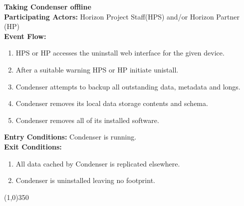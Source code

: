 	\textbf{Taking Condenser offline} \\	 
	\textbf{Participating Actors:}  Horizon Project Staff(HPS) and/or Horizon Partner (HP) \\
	\textbf{Event Flow:}
	\begin{enumerate}
\item HPS or HP accesses the uninstall web interface for the given device. 
\item After a suitable warning HPS or HP initiate unistall.
\item Condenser attempts to backup all outstanding data, metadata and longs.
\item Condenser removes its local data storage contents and schema.
\item Condenser removes all of its installed software.
    \end{enumerate}
	\textbf{Entry Conditions:} Condenser is running.\\
	\textbf{Exit Conditions:}\\	
	\begin{enumerate}
\item All data cached by Condenser is replicated elsewhere.
\item Condenser is uninstalled leaving no footprint.
    \end{enumerate}
	\line(1,0){350}		